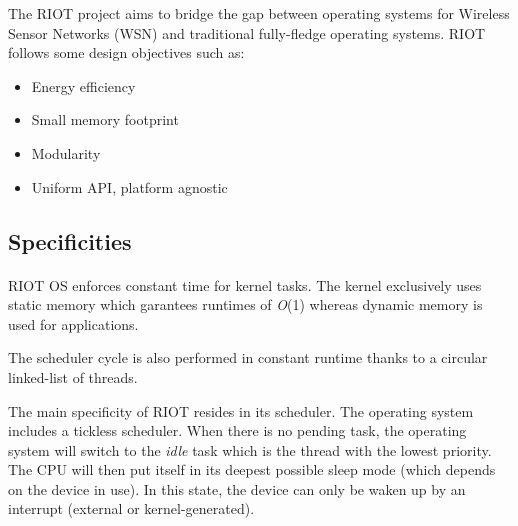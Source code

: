 The RIOT project aims to bridge the gap between operating systems for Wireless Sensor Networks (WSN) and traditional fully-fledge operating systems.
RIOT follows some design objectives such as:
\begin{itemize}
    \item Energy efficiency
    \item Small memory footprint
    \item Modularity
    \item Uniform API, platform agnostic
\end{itemize}

\subsection{Specificities}
\paragraph{}
RIOT OS enforces constant time for kernel tasks.
The kernel exclusively uses static memory which garantees runtimes of \textit{O}(1) whereas dynamic memory is used for applications.

The scheduler cycle is also performed in constant runtime thanks to a circular linked-list of threads.

The main specificity of RIOT resides in its scheduler.
The operating system includes a tickless scheduler.
When there is no pending task, the operating system will switch to the \textit{idle} task which is the thread with the lowest priority.
The CPU will then put itself in its deepest possible sleep mode (which depends on the device in use).
In this state, the device can only be waken up by an interrupt (external or kernel-generated).
